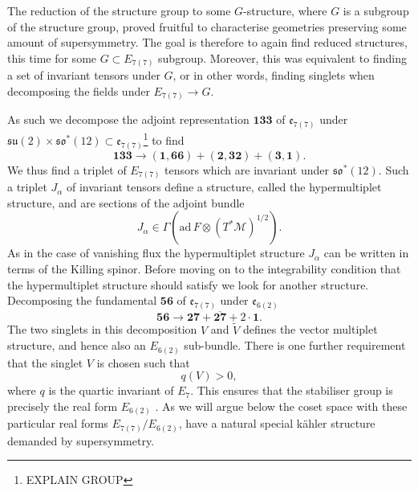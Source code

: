 The reduction of the structure group to some $G$-structure, where $G$ is a subgroup of the structure group, proved fruitful to characterise geometries preserving some amount of supersymmetry. The goal is therefore to again find reduced structures, this time for some $G\subset E_{7(7)}$ subgroup. Moreover, this was equivalent to finding a set of invariant tensors under $G$, or in other words, finding singlets when decomposing the fields under $E_{7(7)}\to G$. 

As such we decompose the adjoint representation $\mathbf{133}$ of $\mathfrak{e}_{7(7)}$ under $\mathfrak{su}(2)\times\mathfrak{so}^*(12)\subset \mathfrak{e}_{7(7)}$\footnote{EXPLAIN GROUP} to find 
\begin{equation}
    \mathbf{133}\to (\mathbf{1},\mathbf{66})+(\mathbf{2},\mathbf{32})+(\mathbf{3},\mathbf{1}).
\end{equation}
We thus find a triplet of $E_{7(7)}$ tensors which are invariant under $\mathfrak{so}^*(12)$. Such a triplet $J_\alpha$ of invariant tensors define a structure, called the hypermultiplet structure, and are sections of the adjoint bundle 
\begin{equation}
    J_\alpha \in \Gamma(\text{ad}\, F\otimes \left(T^*\mathcal{M}\right)^{1/2}).
\end{equation}
As in the case of vanishing flux the hypermultiplet structure $J_\alpha$ can be written in terms of the Killing spinor. Before moving on to the integrability condition that the hypermultiplet structure should satisfy we look for another structure. Decomposing the fundamental $\mathbf{56}$ of $\mathfrak{e}_{7(7)}$ under $\mathfrak{e}_{6(2)}$
\begin{equation}
    \mathbf{56}\to\mathbf{27}+\overbar{\mathbf{27}}+2\cdot \mathbf{1}.
\end{equation}
The two singlets in this decomposition $V$ and $\tilde{V}$ defines the vector multiplet structure, and hence also an $E_{6(2)}$ sub-bundle. There is one further requirement that the singlet $V$ is chosen such that 
\begin{equation}
    q(V)>0,
\end{equation}
where $q$ is the quartic invariant of $E_7$. This ensures that the stabiliser group is precisely the real form $E_{6(2)}$ \cite{Ferrara:1997uz}. As we will argue below the coset space with these particular real forms $E_{7(7)}/E_{6(2)}$, have a natural special kähler structure demanded by supersymmetry. 

